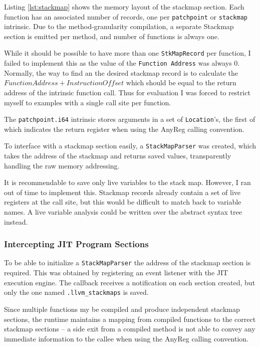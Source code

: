 \documentclass[journal,comsoc]{IEEEtran}
\begin{document}
		Listing \ref{lst:stackmap} shows the memory layout of the stackmap section. Each function has an associated number of records, one per \lstinline|patchpoint| or \lstinline|stackmap| intrinsic. Due to the method-granularity compilation, a separate Stackmap section is emitted per method, and number of functions is always one.
		
		While it should be possible to have more than one \lstinline|StkMapRecord| per function, I failed to implement this as the value of the \lstinline|Function Address| was always 0. Normally, the way to find an the desired stackmap record is to calculate the $Function Address + Instruction Offset$ which should be equal to the return address of the intrinsic function call. Thus for evaluation I was forced to restrict myself to examples with a single call site per function.
		
		The \lstinline|patchpoint.i64| intrinsic stores arguments in a set of \lstinline|Location|'s, the first of which indicates the return register when using the AnyReg calling convention.
		
		To interface with a stackmap section easily, a \lstinline|StackMapParser| was created, which takes the address of the stackmap and returns saved values, transparently handling the raw memory addressing. 
		
		It is recommendable to save only live variables to the stack map. However, I ran out of time to implement this. Stackmap records already contain a set of live registers at the call site, but this would be difficult to match back to variable names. A live variable analysis could be written over the abstract syntax tree instead.
	 
	\subsubsection{Intercepting JIT Program Sections}
		To be able to initialize a \lstinline|StackMapParser| the address of the stackmap section is required. This was obtained by registering an event listener with the JIT execution engine. The callback receives a notification on each section created, but only the one named \lstinline|.llvm_stackmaps| is saved.
		
		Since multiple functions my be compiled and produce independent stackmap sections, the runtime maintains a mapping from compiled functions to the correct stackmap sections -- a side exit from a compiled method is not able to convey any immediate information to the callee when using the AnyReg calling convention.
		
\end{document}
